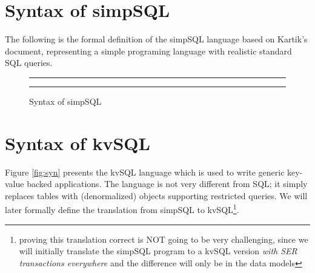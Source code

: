 \documentclass[12pt,letter]{article}
\begin{document}


\section{Syntax of simpSQL}
The following is the formal definition of the simpSQL language based on Kartik's document,
representing a simple programing language with realistic standard SQL queries.

\begin{figure}[h]
	\hrule \hrule 
\caption{Syntax of simpSQL}
\label{fig:standard}
\end{figure}



\section{Syntax of kvSQL}
Figure \ref{fig:syn} presents the kvSQL language which is used to write
generic key-value backed applications. The language is not very
different from SQL; it simply replaces tables with (denormalized)
objects supporting restricted queries. We will later formally define the
translation from simpSQL to kvSQL\footnote{proving this translation
correct is NOT going to be very challenging, since we will initially translate the simpSQL
program to a kvSQL version \emph{with SER transactions everywhere} and the difference will
only be in the data models}.
\end{document}
